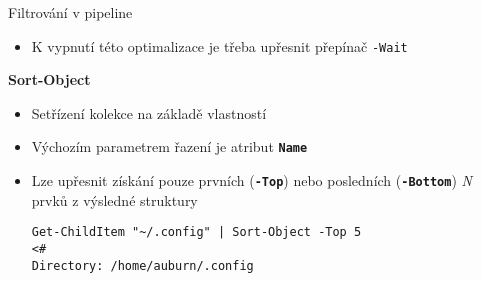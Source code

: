 \documentclass[main.tex]{subfiles}
\begin{document}
\begin{frame}{Filtrování v pipeline}
\begin{itemize}
        \begin{itemize}
          \item K vypnutí této optimalizace je třeba upřesnit přepínač \texttt{-Wait}
        \end{itemize}
    \end{itemize}
\framebreak
\textbf{Sort-Object}
\begin{itemize}
  \item Setřízení kolekce na základě vlastností
  \item Výchozím parametrem řazení je atribut \textbf{\texttt{Name}}
  \item Lze upřesnit získání pouze prvních (\textbf{\texttt{-Top}}) nebo posledních (\textbf{\texttt{-Bottom}}) \textit{N} prvků z výsledné struktury\vspace{2mm}
    \begin{verbatim}
Get-ChildItem "~/.config" | Sort-Object -Top 5
<#
Directory: /home/auburn/.config


\end{verbatim}
\end{itemize}
\end{frame}
\end{document}
